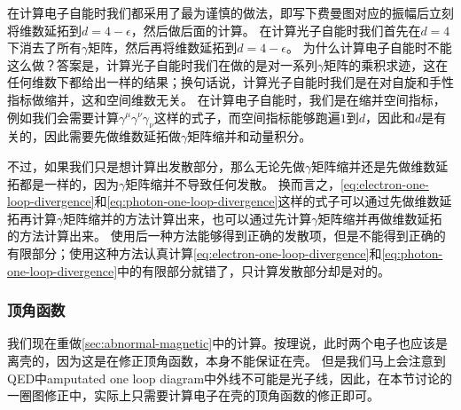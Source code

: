 在计算电子自能时我们都采用了最为谨慎的做法，即写下费曼图对应的振幅后立刻将维数延拓到$d=4-\epsilon$，然后做后面的计算。
在计算光子自能时我们首先在$d=4$下消去了所有$\gamma$矩阵，然后再将维数延拓到$d = 4 - \epsilon$。
为什么计算电子自能时不能这么做？答案是，计算光子自能时我们在做的是对一系列$\gamma$矩阵的乘积求迹，这在任何维数下都给出一样的结果；换句话说，计算光子自能时我们是在对自旋和手性指标做缩并，这和空间维数无关。
在计算电子自能时，我们是在缩并空间指标，例如我们会需要计算$\gamma^\mu \gamma^\nu \gamma_\nu$这样的式子，而空间指标能够跑遍$1$到$d$，因此和$d$是有关的，因此需要先做维数延拓做$\gamma$矩阵缩并和动量积分。

不过，如果我们只是想计算出发散部分，那么无论先做$\gamma$矩阵缩并还是先做维数延拓都是一样的，因为$\gamma$矩阵缩并不导致任何发散。
换而言之，\eqref{eq:electron-one-loop-divergence}和\eqref{eq:photon-one-loop-divergence}这样的式子可以通过先做维数延拓再计算$\gamma$矩阵缩并的方法计算出来，也可以通过先计算$\gamma$矩阵缩并再做维数延拓的方法计算出来。
使用后一种方法能够得到正确的发散项，但是不能得到正确的有限部分；使用这种方法认真计算\eqref{eq:electron-one-loop-divergence}和\eqref{eq:photon-one-loop-divergence}中的有限部分就错了，只计算发散部分却是对的。

\subsubsection{顶角函数}

我们现在重做\autoref{sec:abnormal-magnetic}中的计算。按理说，此时两个电子也应该是离壳的，因为这是在修正顶角函数，本身不能保证在壳。
但是我们马上会注意到QED中amputated one loop diagram中外线不可能是光子线，因此，在本节讨论的一圈图修正中，实际上只需要计算电子在壳的顶角函数的修正即可。

